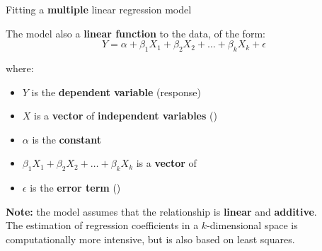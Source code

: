 \documentclass{beamer}
\begin{document}
	\begin{frame}[t]{Fitting a \textbf{multiple} linear regression model}
		
		The model also  a \textbf{linear function} to the data, of the form: $$Y = \alpha+\beta_1 X_1+\beta_2 X_2+\ldots+\beta_k X_k+\epsilon$$
	
		where:
		
		\begin{itemize}
		 	\item $Y$ is the \textbf{dependent variable} (response)
		 	\item $X$ is a \textbf{vector} of \textbf{independent variables} ()
		 	\item $\alpha$ is the \textbf{constant}
		 	\item $\beta_1 X_1+\beta_2 X_2+\ldots+\beta_k X_k$ is a \textbf{vector} of \textbf{}
		 	\item $\epsilon$ is the \textbf{error term} ()
		\end{itemize}

		\vspace{.5em}
		\textbf{Note:} the model assumes that the relationship is \textbf{linear} and \textbf{additive}.\\[.5em]

		The estimation of regression coefficients in a $k$-dimensional space is computationally more intensive, but is also based on least squares.
		
	\end{frame}
	
	


\end{document}
